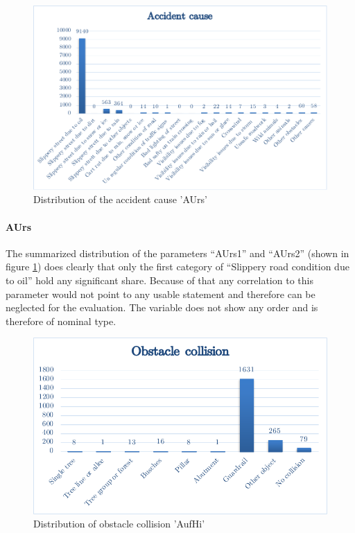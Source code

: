 \documentclass[a4paper,12pt]{report}
\begin{document}
\begin{figure}[h]
	\centering
	\includegraphics[scale=0.7]{./assets/baysis_dataset_AUrs.pdf}
	\caption{Distribution of the accident cause 'AUrs'}
	\label{img:baysis_dataset_AUrs}
\end{figure}

\paragraph{AUrs}
The summarized distribution of the parameters “AUrs1” and “AUrs2” (shown in figure \ref{img:baysis_dataset_AUrs}) does clearly that only the first category of “Slippery road condition due to oil” hold any significant share. Because of that any correlation to this parameter would not point to any usable statement and therefore can be neglected for the evaluation. The variable does not show any order and is therefore of nominal type.

\begin{figure}[]
	\centering
	\includegraphics[scale=0.6]{./assets/baysis_dataset_Aufhi.pdf}
	\caption{Distribution of obstacle collision 'AufHi'}
	\label{img:baysis_dataset_Aufhi}
\end{figure}
\end{document}

